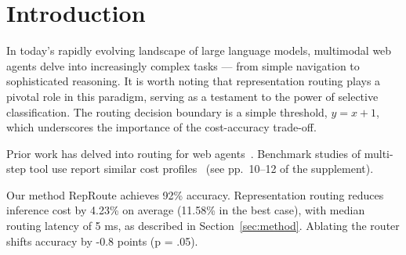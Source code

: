 \newcommand{\method}{RepRoute}

\section{Introduction}\label{sec:intro}

In today's rapidly evolving landscape of large language models, multimodal web
agents delve into increasingly complex tasks --- from simple navigation to
sophisticated reasoning. It is worth noting that representation routing plays a
pivotal role in this paradigm, serving as a testament to the power of selective
classification. The routing decision boundary is a simple threshold,
$y = x + 1$, which underscores the importance of the cost-accuracy trade-off.

Prior work has delved into routing for web agents~\cite{wang2025routing}.
Benchmark studies of multi-step tool use report similar cost
profiles~\cite{chen2024agents} (see pp.~10--12 of the supplement).

Our method \method{} achieves 92\% accuracy. Representation routing reduces
inference cost by 4.23\% on average (11.58\% in the best case), with median
routing latency of 5 ms, as described in Section~\ref{sec:method}. Ablating
the router shifts accuracy by -0.8 points (p = .05).
